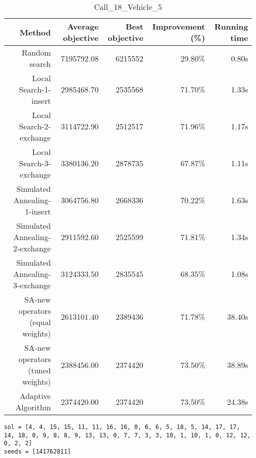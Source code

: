 \begin{table}[ht]
\centering
\caption{Call\_18\_Vehicle\_5}
\label{tab:call18vehicle5}
\begin{tabular}{|r|r|r|r|r|}
Method & Average objective & Best objective & Improvement (\%) & Running time \\
\hline
Random search & 7195792.08 & 6215552 & 29.80\% & 0.80s\\
Local Search-1-insert & 2985468.70 & 2535568 & 71.70\% & 1.33s\\
Local Search-2-exchange & 3114722.90 & 2512517 & 71.96\% & 1.17s\\
Local Search-3-exchange & 3380136.20 & 2878735 & 67.87\% & 1.11s\\
Simulated Annealing-1-insert & 3064756.80 & 2668336 & 70.22\% & 1.63s\\
Simulated Annealing-2-exchange & 2911592.60 & 2525599 & 71.81\% & 1.34s\\
Simulated Annealing-3-exchange & 3124333.50 & 2835545 & 68.35\% & 1.08s\\
SA-new operators (equal weights) & 2613101.40 & 2389436 & 71.78\% & 38.40s\\
SA-new operators (tuned weights) & 2388456.00 & 2374420 & 73.50\% & 38.89s\\
Adaptive Algorithm & 2374420.00 & 2374420 & 73.50\% & 24.38s\\
\end{tabular}%
\end{table}
\begin{lstlisting}[label={lst:call18vehicle5},caption=Optimal solution call\_18\_vehicle\_5]
sol = [4, 4, 15, 15, 11, 11, 16, 16, 0, 6, 6, 5, 18, 5, 14, 17, 17, 14, 18, 0, 9, 8, 8, 9, 13, 13, 0, 7, 7, 3, 3, 10, 1, 10, 1, 0, 12, 12, 0, 2, 2]
seeds = [141762811]
\end{lstlisting}%
\clearpage


